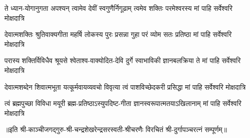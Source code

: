 

\fourlineindentedshloka
{ते ध्यान-योगानुगता अपश्यन्}
{त्वामेव देवीं स्वगुणैर्निगूढाम्}
{त्वमेव शक्तिः परमेश्वरस्य}
{मां पाहि सर्वेश्वरि मोक्षदात्रि}%

\fourlineindentedshloka
{देवात्मशक्तिः श्रुतिवाक्यगीता}
{महर्षि लोकस्य पुरः प्रसन्ना}
{गुहा परं व्योम सतः प्रतिष्ठा}
{मां पाहि सर्वेश्वरि मोक्षदात्रि}%

\fourlineindentedshloka
{परास्य शक्तिर्विविधैव श्रूयसे}
{श्वेताश्व-वाक्योदित-देवि दुर्गे}
{स्वाभाविकी ज्ञानबलक्रिया ते}
{मां पाहि सर्वेश्वरि मोक्षदात्रि}%

\fourlineindentedshloka
{देवात्मशब्देन शिवात्मभूता}
{यत्कूर्मवायव्यवचो विवृत्या}
{त्वं पाशविच्छेदकरी प्रसिद्धा}
{मां पाहि सर्वेश्वरि मोक्षदात्रि}%

\fourlineindentedshloka
{त्वं ब्रह्मपुच्छा विविधा मयूरी}
{ब्रह्म-प्रतिष्ठाऽस्युपदिष्ट-गीता}
{ज्ञानस्वरूपात्मतयाऽखिलानाम्}
{मां पाहि सर्वेश्वरि मोक्षदात्रि}%

{॥इति श्री-काञ्चीजगद्गुरु-श्री-चन्द्रशेखरेन्द्रसरस्वती-श्रीचरणैः विरचितं श्री-दुर्गापञ्चरत्नं सम्पूर्णम्॥}

